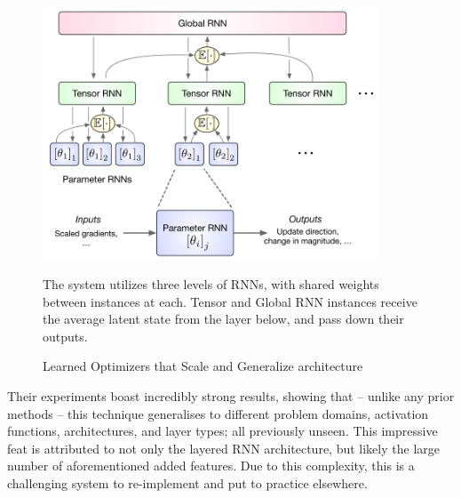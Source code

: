 \documentclass{report}
\begin{document}
\begin{figure}[h]
 \centering
 \includegraphics[width=10cm]{scalearchitecture}
 \caption{Learned Optimizers that Scale and Generalize architecture}
 The system utilizes three levels of RNNs, with shared weights between instances at each. Tensor and Global RNN instances receive the average latent state from the layer below, and pass down their outputs.
 \label{fig:optimizer-that-scale:1}
\end{figure}
Their experiments boast incredibly strong results, showing that -- unlike any prior methods -- this technique generalises to different problem domains, activation functions, architectures, and layer types; all previously unseen. This impressive feat is attributed to not only the layered RNN architecture, but likely the large number of aforementioned added features. Due to this complexity, this is a challenging system to re-implement and put to practice elsewhere. \par
\end{document}
